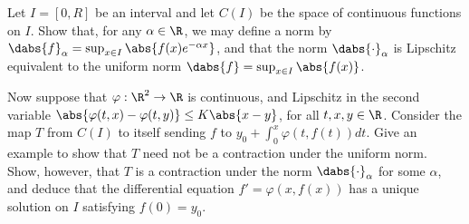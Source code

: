 \begin{problem}Let $I = [0,R]$ be an interval and let $C(I)$ be the space of continuous functions on $I$. Show that, for any $\alpha \in \R$, we may define a norm by $\dabs{f}_\alpha = \sup_{x\in I} \abs{f(x)e^{-\alpha x}}$, and that the norm $\dabs{\cdot}_\alpha$ is Lipschitz equivalent to the uniform norm $\dabs{f} = \sup_{x\in I}\abs{f(x)}$.

Now suppose that $\varphi: \R^2 \to \R$ is continuous, and Lipschitz in the second variable $\abs{\varphi(t,x) - \varphi(t, y)} \leq K\abs{x - y}$, for all $t,x,y \in \R$. Consider the map $T$ from $C(I)$ to itself sending $f$ to $y_0+ \int^x_0 \varphi(t,f(t))dt$. Give an example to show that $T$ need not be a contraction under the uniform norm. Show, however, that $T$ is a contraction under the norm $\dabs{\cdot}_\alpha$ for some $\alpha$, and deduce that the differential equation $f' = \varphi(x,f(x))$ has a unique solution on $I$ satisfying $f(0) = y_0$.



\end{problem}

